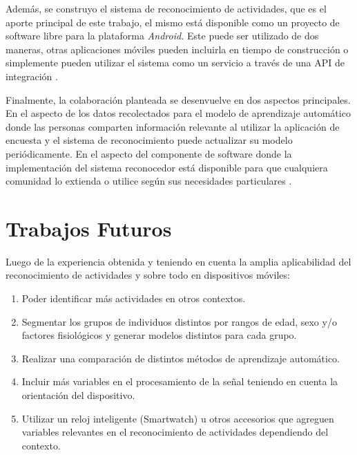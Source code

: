 Además, se construyo el sistema de reconocimiento de actividades,
que es el aporte principal de este trabajo, el mismo está disponible
como un proyecto de software libre para la plataforma \emph{Android.}
Este puede ser utilizado de dos maneras, otras aplicaciones móviles
pueden incluirla en tiempo de construcción o simplemente pueden utilizar
el sistema como un servicio a través de una API de integración \cite{hardroid2016a}.

Finalmente, la colaboración planteada se desenvuelve en dos aspectos
principales. En el aspecto de los datos recolectados para el modelo
de aprendizaje automático donde las personas comparten información
relevante al utilizar la aplicación de encuesta y el sistema de reconocimiento
puede actualizar su modelo periódicamente. En el aspecto del componente
de software donde la implementación del sistema reconocedor está disponible
para que cualquiera comunidad lo extienda o utilice según sus necesidades
particulares \cite{hardroid2016b}.

\section{Trabajos Futuros}

\label{trabajos-futuros}

Luego de la experiencia obtenida y teniendo en cuenta la amplia aplicabilidad
del reconocimiento de actividades y sobre todo en dispositivos móviles:
\begin{enumerate}
\item Poder identificar más actividades en otros contextos. 
\item Segmentar los grupos de individuos distintos por rangos de edad, sexo
y/o factores fisiológicos y generar modelos distintos para cada grupo. 
\item Realizar una comparación de distintos métodos de aprendizaje automático. 
\item Incluir más variables en el procesamiento de la señal teniendo en
cuenta la orientación del dispositivo. 
\item Utilizar un reloj inteligente (Smartwatch) u otros accesorios que
agreguen variables relevantes en el reconocimiento de actividades
dependiendo del contexto. 
\end{enumerate}

